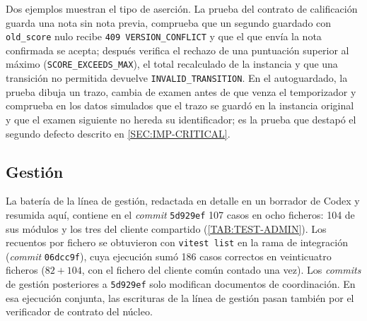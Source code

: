 Dos ejemplos muestran el tipo de aserción. La prueba del contrato de calificación guarda
una nota sin nota previa, comprueba que un segundo guardado con \texttt{old\_score} nulo
recibe \texttt{409 VERSION\_CONFLICT} y que el que envía la nota confirmada se acepta;
después verifica el rechazo de una puntuación superior al máximo
(\texttt{SCORE\_EXCEEDS\_MAX}), el total recalculado de la instancia y que una transición
no permitida devuelve \texttt{INVALID\_TRANSITION}. En el autoguardado, la prueba dibuja un trazo, cambia de examen antes de que venza el
temporizador y comprueba en los datos simulados que el trazo se guardó en la instancia
original y que el examen siguiente no hereda su identificador; es la prueba que destapó el
segundo defecto descrito en \cref{SEC:IMP-CRITICAL}.

\subsection{Gestión}

La batería de la línea de gestión, redactada en detalle en un borrador de Codex y resumida
aquí, contiene en el \textit{commit} \texttt{5d929ef} 107 casos en ocho ficheros: 104 de
sus módulos y los tres del cliente compartido (\cref{TAB:TEST-ADMIN}). Los recuentos por
fichero se obtuvieron con \texttt{vitest list} en la rama de integración
(\textit{commit} \texttt{06dcc9f}), cuya ejecución sumó 186 casos correctos en veinticuatro
ficheros ($82 + 104$, con el fichero del cliente común contado una vez). Los \textit{commits}
de gestión posteriores a \texttt{5d929ef} solo modifican documentos de coordinación. En esa ejecución
conjunta, las escrituras de la línea de gestión pasan también por el verificador de
contrato del núcleo.

